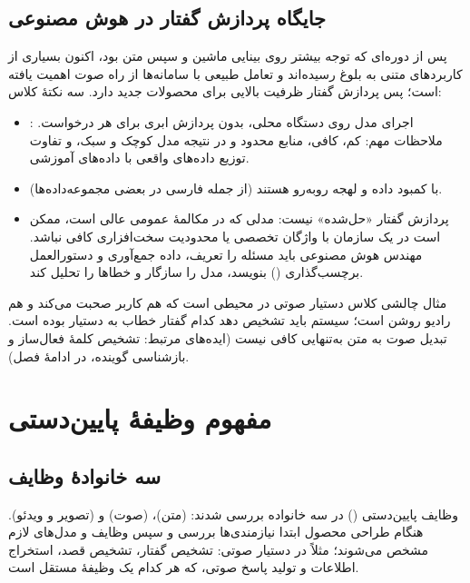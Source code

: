\subsection{جایگاه پردازش گفتار در هوش مصنوعی}
پس از دوره‌ای که توجه بیشتر روی بینایی ماشین و سپس متن بود، اکنون بسیاری از کاربردهای متنی به بلوغ رسیده‌اند و تعامل طبیعی با سامانه‌ها از راه صوت اهمیت یافته است؛ پس پردازش گفتار ظرفیت بالایی برای محصولات جدید دارد. سه نکتهٔ کلاس:
\begin{itemize}
  \item {}: اجرای مدل روی دستگاه محلی، بدون پردازش ابری برای هر درخواست. ملاحظات مهم:  کم،  کافی، منابع محدود و در نتیجه مدل کوچک و سبک، و تفاوت توزیع داده‌های واقعی با داده‌های آموزشی.
  \item {} (از جمله فارسی در بعضی مجموعه‌داده‌ها) با کمبود داده و لهجه روبه‌رو هستند.
  \item پردازش گفتار «حل‌شده» نیست: مدلی که در مکالمهٔ عمومی عالی است، ممکن است در یک سازمان با واژگان تخصصی یا محدودیت سخت‌افزاری کافی نباشد. مهندس هوش مصنوعی باید مسئله را تعریف، داده جمع‌آوری و دستورالعمل برچسب‌گذاری () بنویسد، مدل را سازگار و خطاها را تحلیل کند.
\end{itemize}

\begin{assignmentbox}{مثال چالشی کلاس}
دستیار صوتی در محیطی است که هم کاربر صحبت می‌کند و هم رادیو روشن است؛ سیستم باید تشخیص دهد کدام گفتار خطاب به دستیار بوده است. تبدیل صوت به متن به‌تنهایی کافی نیست (ایده‌های مرتبط: تشخیص کلمهٔ فعال‌ساز و بازشناسی گوینده، در ادامهٔ فصل).
\end{assignmentbox}

\section{مفهوم وظیفهٔ پایین‌دستی}
\subsection{سه خانوادهٔ وظایف}
وظایف پایین‌دستی () در سه خانواده بررسی شدند:  (متن)،  (صوت) و  (تصویر و ویدئو). هنگام طراحی محصول ابتدا نیازمندی‌ها بررسی و سپس وظایف و مدل‌های لازم مشخص می‌شوند؛ مثلاً در دستیار صوتی: تشخیص گفتار، تشخیص قصد، استخراج اطلاعات و تولید پاسخ صوتی، که هر کدام یک وظیفهٔ مستقل است.

